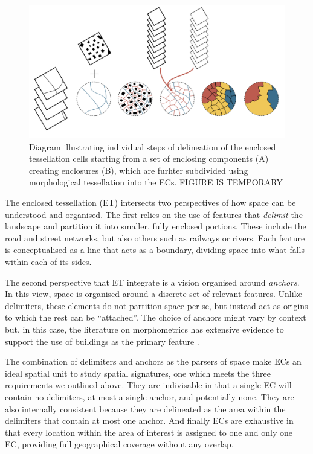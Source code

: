 \begin{figure}
        \includegraphics[width=\linewidth]{figures/tessellation.png}
        \caption{Diagram illustrating individual steps of delineation of the enclosed
        tessellation cells starting from a set of enclosing components (A) creating
        enclosures (B), which are furhter subdivided using morphological tessellation
        into the ECs. FIGURE IS TEMPORARY}
        \label{fig:tessellation}
\end{figure}

The enclosed tessellation (ET) intersects two perspectives of how space can be
understood and organised.
%
The first relies on the use of features that \textit{delimit} the landscape and
partition it into smaller, fully enclosed portions. These include the road and
street networks, but also others such as railways or rivers. Each feature is
conceptualised as a line that acts as a boundary, dividing space into what falls
within each of its sides.

The second perspective that ET integrate is a vision organised around
\textit{anchors}. In this view, space is organised around
a discrete set of relevant features. Unlike delimiters, these elements do not
partition space per se, but instead act as origins to which the rest can be
``attached''.
%
The choice of anchors might vary by context but, in this case, the literature on
morphometrics has extensive evidence to support the use of buildings as the
primary feature \citep{hamaina2012a, usui2013estimation, schirmer2015}.


The combination of delimiters and anchors as the parsers of space make ECs an
ideal spatial unit to study spatial signatures, one which
meets the three requirements we outlined above.
%
They are indivisable in that a single EC will contain no delimiters, at most a
single anchor, and potentially none.
%
They are also internally consistent because they are delineated as the area
within the delimiters that contain at most one anchor.
%
And finally ECs are exhaustive in that every location within the area of
interest is assigned to one and only one EC, providing full geographical
coverage without any overlap.
